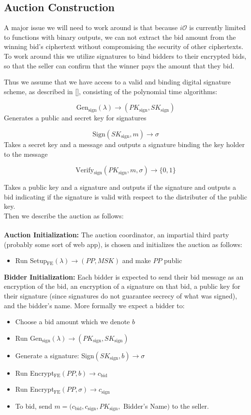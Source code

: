 \documentclass[12pt,twoside]{reedthesis}
\begin{document}
    \subsection{Auction Construction}
    \newcommand{\sign}[0]{_\text{sign}}
    \par A major issue we will need to work around is that because $i\mathcal{O}$ is currently limited to functions with binary outputs, we can not extract the bid amount from the winning bid's ciphertext without compromising the security of other ciphertexts. To work around this we utilize signatures to bind bidders to their encrypted bids, so that the seller can confirm that the winner pays the amount that they bid.
    \par Thus we assume that we have access to a valid and binding digital signature scheme, as described in [\cite{Katz:2007:IMC:1206501}], consisting of the polynomial time algorithms: 
    
    
    
    $$\text{Gen$_\text{sign}(\lambda) \to (PK\sign,SK\sign)$}$$ 
Generates a public and secret key for signatures
    
    
    
    $$\text{Sign$(SK\sign,m) \to \sigma$}$$ 
    Takes a secret key and a message and outputs a signature binding the key holder to the message
    
    $$\text{Verify$\sign(PK\sign,m,\sigma)\to \{0,1\}$}$$
    
    Takes a public key and a signature and outputs if the signature and outputs a bid indicating if the signature is valid with respect to the distributer of the public key. \\
    Then we describe the auction as follows: \\ \\
        \textbf{Auction Initialization:} The auction coordinator, an impartial third party (probably some sort of web app), is chosen and initializes the auction as follows:
    \begin{itemize}
    \item Run Setup$_\text{FE}(\lambda)\to (PP,MSK)$ and make $PP$ public
    \end{itemize}
%
%
%
    \textbf{Bidder Initialization:} Each bidder is expected to send their bid message as an encryption of the bid, an encryption of a signature on that bid, a public key for their signature (since signatures do not guarantee secrecy of what was signed), and the bidder's name. More formally we expect a bidder to:
     \begin{itemize}
     \item Choose a bid amount which we denote $b$
     \item Run Gen$\sign(\lambda) \to (PK\sign,SK\sign)$
     \item Generate a signature: Sign$(SK\sign,b)\to \sigma$
     \item Run Encrypt$_\text{FE}(PP,b) \to c_\text{bid}$
     \item Run  Encrypt$_\text{FE}(PP,\sigma)\to c\sign$
     \item To bid, send $m = (c_\text{bid},c\sign,PK\sign,$ Bidder's Name$)$ to the seller.
     \end{itemize} 
     
\end{document}
